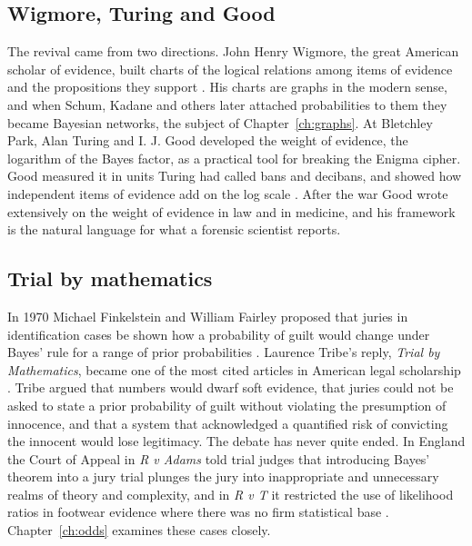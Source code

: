 \subsection{Wigmore, Turing and Good}

The revival came from two directions. John Henry Wigmore, the great American scholar of evidence, built charts of the logical relations among items of evidence and the propositions they support \citep{wigmore1913}. His charts are graphs in the modern sense, and when Schum, Kadane and others later attached probabilities to them \citep{kadane_schum1996} they became Bayesian networks, the subject of Chapter~\ref{ch:graphs}. At Bletchley Park, Alan Turing and I. J. Good developed the weight of evidence, the logarithm of the Bayes factor, as a practical tool for breaking the Enigma cipher. Good measured it in units Turing had called bans and decibans, and showed how independent items of evidence add on the log scale \citep{good1950,good1979}. After the war Good wrote extensively on the weight of evidence in law and in medicine, and his framework is the natural language for what a forensic scientist reports.

\subsection{Trial by mathematics}

In 1970 Michael Finkelstein and William Fairley proposed that juries in identification cases be shown how a probability of guilt would change under Bayes' rule for a range of prior probabilities \citep{finkelstein1970}. Laurence Tribe's reply, \emph{Trial by Mathematics}, became one of the most cited articles in American legal scholarship \citep{tribe1971}. Tribe argued that numbers would dwarf soft evidence, that juries could not be asked to state a prior probability of guilt without violating the presumption of innocence, and that a system that acknowledged a quantified risk of convicting the innocent would lose legitimacy. The debate has never quite ended. In England the Court of Appeal in \emph{R v Adams} told trial judges that introducing Bayes' theorem into a jury trial plunges the jury into inappropriate and unnecessary realms of theory and complexity, and in \emph{R v T} it restricted the use of likelihood ratios in footwear evidence where there was no firm statistical base \citep{donnelly2005,fenton2016}. Chapter~\ref{ch:odds} examines these cases closely.

